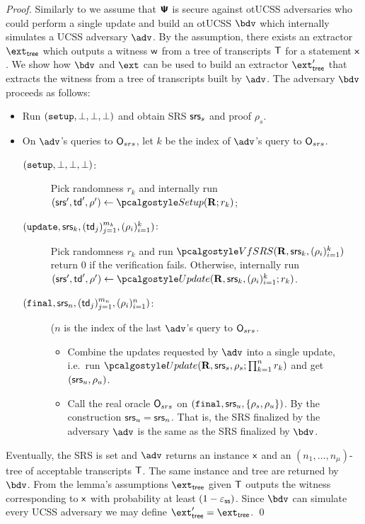 \documentclass[runningheads,11pt]{llncs}
\begin{document}
\begin{proof}
  Similarly to \cite{C:GKMMM18} we assume that $\bm{\mathsf{\Psi}}$ is secure against otUCSS
  adversaries who could perform a single update and build an otUCSS $\bdv$ which
  internally simulates a UCSS adversary $\adv$. By the assumption, there exists
  an extractor $\extt$ which outputs a witness $\mathsf{w}$ from a tree of
  transcripts $\mathsf{T}$ for a statement $\mathsf{x}$. We show how $\bdv$ and $\ext$
  can be used to build an extractor $\extt'$ that extracts the witness from a
  tree of transcripts built by $\adv$. The adversary $\bdv$ proceeds as follows:
  \begin{itemize}
  \item Run $(\mathtt{setup}, \bot, \bot, \bot)$ and obtain SRS $\mathsf{srs}_s$ and proof
    $\rho_s$.
  \item On $\adv$'s queries to $\mathsf{O}_{srs}$, let $k$ be the index of $\adv$'s
    query to $\mathsf{O}_{srs}$.
    \begin{description}
    \item [$(\mathtt{setup}, \bot, \bot, \bot)$:] Pick randomness $r_k$ and internally
      run $(\srs', \td', \rho') \gets \algsetup(\REL; r_k)$;
    \item [$(\mathtt{update}, \mathsf{srs}_{k}, (\mathsf{td}_j)_{j = 1}^{m_k}, (\rho_i)_{i = 1}^{k})$:]
      Pick randomness $r_k$ and run
      $\algverifysrs(\REL, \srs_{k}, (\rho_i)_{i = 1}^{k})$ return $0$ if the
      verification fails. Otherwise, internally run
      $(\srs', \td', \rho') \gets \algupdate(\REL, \srs_{k}, (\rho_i)_{i =
        1}^{k}; r_k)$.
    \item [$(\mathtt{final}, \mathsf{srs}_{n}, (\mathsf{td}_j)_{j = 1}^{m_n}, (\rho_i)_{i = 1}^{n})$:]
      ($n$ is the index of the last $\adv$'s query to
      $\mathsf{O}_{srs}$.
      \begin{itemize}
      \item Combine the updates requested by $\adv$ into a single update,
        i.e.~run $\algupdate(\REL, \srs_s, \rho_s; \prod_{k = 1}^n r_k)$ and get
        $(\mathsf{srs}_u, \rho_u)$.
      \item Call the real oracle $\mathsf{O}_{srs}$ on
        $(\mathtt{final}, \mathsf{srs}_u, \{\rho_s, \rho_u\})$. By the construction
        $\mathsf{srs}_u = \mathsf{srs}_n$. That is, the SRS finalized by the adversary $\adv$ is
        the same as the SRS finalized by $\bdv$.
      \end{itemize}
    \end{description}
  \end{itemize}

  Eventually, the SRS is set and $\adv$ returns an instance $\mathsf{x}$ and an
  $(n_1, \ldots, n_\mu)$-tree of acceptable transcripts $\mathsf{T}$. The same
  instance and tree are returned by $\bdv$. From the lemma's assumptions $\extt$
  given $\mathsf{T}$ outputs the witness corresponding to $\mathsf{x}$ with probability at
  least $(1 - \varepsilon_{\mathsf{ss}})$. Since $\bdv$ can simulate every UCSS adversary we may
  define $\extt' = \extt$.  \qed
\end{proof}
\end{document}
